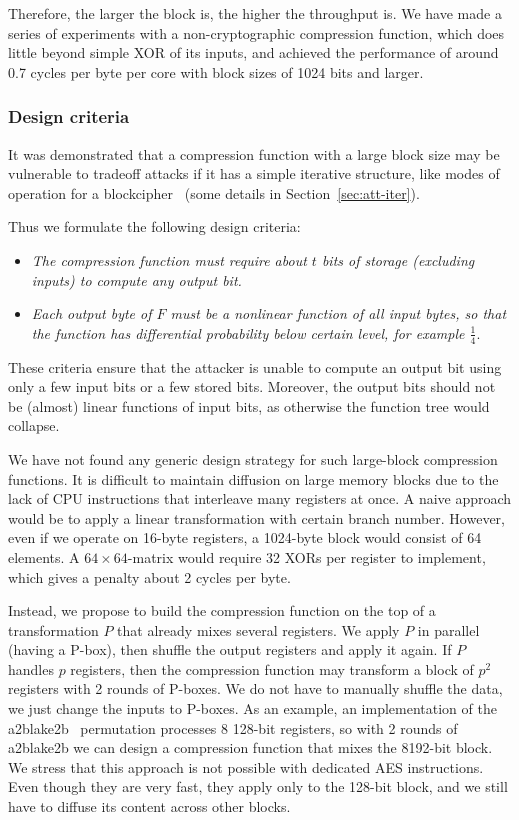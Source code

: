 \documentclass[a4paper]{article}
\begin{document}
Therefore, the larger the block is, the higher the throughput is. We have made a series of experiments with a non-cryptographic compression function, which does little beyond simple XOR of its inputs, and achieved the performance of around 0.7 cycles per byte per core with block sizes of 1024 bits and larger.

\subsubsection{Design criteria}

It was demonstrated that a compression function with a large block size may be vulnerable to tradeoff attacks if it has a simple iterative structure, like modes of operation for a blockcipher~\cite{trade-att} (some details in Section~\ref{sec:att-iter}). 

Thus we formulate the following design criteria:
\begin{itemize}
  \item \emph{The compression function must require about $t$ bits of storage (excluding inputs) to compute any output bit.}
  \item \emph{Each output byte of $F$ must be a nonlinear function of all input bytes, so that the function has differential probability below certain level, for example $\frac{1}{4}$}.
\end{itemize}
These criteria ensure that the attacker is unable to compute an output bit using only a few input bits or a few stored bits. Moreover, the output bits should not be (almost) linear functions of input bits, as otherwise the function tree would collapse.

We have not found any generic design strategy for such large-block compression functions. It is difficult to maintain diffusion on large memory blocks due to the lack of CPU instructions that interleave many registers at once. A naive approach would be to apply a linear transformation with certain branch number. However, even if we operate on 16-byte registers, a 1024-byte block would consist of 64 elements. A $64\times 64$-matrix would require 32 XORs per register to implement, which gives a penalty about 2 cycles per byte.

Instead, we propose to build the compression function on the top of a transformation $P$ that already mixes several registers. We apply $P$ in parallel (having a P-box), then shuffle the output registers and apply it again. If $P$ handles $p$ registers, then the compression function may transform a block of $p^2$ registers with 2 rounds of P-boxes. We do not have to manually shuffle the data, we just change the inputs to P-boxes. As an example, an implementation of the a2blake2b~\cite{AumassonNWW13} permutation processes 8 128-bit registers, so with 2 rounds of a2blake2b we can design
a compression function that mixes the 8192-bit block. We stress that this approach is not possible with dedicated AES instructions. Even though they are very fast, they apply only to the 128-bit block, and we still have to diffuse its content across other blocks.
\end{document}

